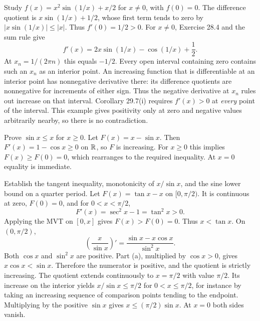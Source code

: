 \goal Study $f(x)=x^2\sin(1/x)+x/2$ for $x\ne0$, with $f(0)=0$.
The difference quotient is $x\sin(1/x)+1/2$, whose first term tends to zero by $|x\sin(1/x)|\le|x|$. Thus $f'(0)=1/2>0$.
For $x\ne0$, Exercise 28.4 and the sum rule give
\[
 f'(x)=2x\sin(1/x)-\cos(1/x)+\frac12.
\]
At $x_n=1/(2\pi n)$ this equals $-1/2$. Every open interval containing zero contains such an $x_n$ as an interior point. An increasing function that is differentiable at an interior point has nonnegative derivative there: its difference quotients are nonnegative for increments of either sign. Thus the negative derivative at $x_n$ rules out increase on that interval.
Corollary 29.7(i) requires $f'(x)>0$ at \emph{every} point of the interval. This example gives positivity only at zero and negative values arbitrarily nearby, so there is no contradiction.

\goal Prove $\sin x\le x$ for $x\ge0$.
Let $F(x)=x-\sin x$. Then $F'(x)=1-\cos x\ge0$ on $\mathbb{R}$, so $F$ is increasing. For $x\ge0$ this implies $F(x)\ge F(0)=0$, which rearranges to the required inequality. At $x=0$ equality is immediate.

\goal Establish the tangent inequality, monotonicity of $x/\sin x$, and the sine lower bound on a quarter period.
Let $F(x)=\tan x-x$ on $[0,\pi/2)$. It is continuous at zero, $F(0)=0$, and for $0<x<\pi/2$,
\[
 F'(x)=\sec^2x-1=\tan^2x>0.
\]
Applying the MVT on $[0,x]$ gives $F(x)>F(0)=0$. Thus $x<\tan x$.
On $(0,\pi/2)$,
\[
 \left(\frac{x}{\sin x}\right)'=
 \frac{\sin x-x\cos x}{\sin^2x}.
\]
Both $\cos x$ and $\sin^2x$ are positive. Part (a), multiplied by $\cos x>0$, gives $x\cos x<\sin x$. Therefore the numerator is positive, and the quotient is strictly increasing.
The quotient extends continuously to $x=\pi/2$ with value $\pi/2$. Its increase on the interior yields $x/\sin x\le\pi/2$ for $0<x\le\pi/2$, for instance by taking an increasing sequence of comparison points tending to the endpoint. Multiplying by the positive $\sin x$ gives $x\le(\pi/2)\sin x$. At $x=0$ both sides vanish.

